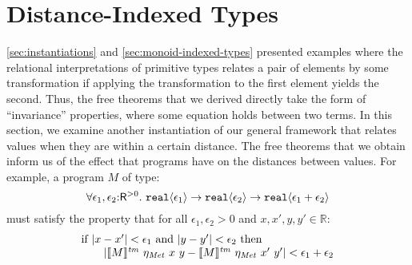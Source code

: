 \section{Distance-Indexed Types}
\label{sec:metric-types}

\newcommand{\Metric}{\mathit{Met}}
\newcommand{\metricSort}{\mathsf{R}^{>0}}

\autoref{sec:instantiations} and \autoref{sec:monoid-indexed-types}
presented examples where the relational interpretations of primitive
types relates a pair of elements by some transformation if applying
the transformation to the first element yields the second. Thus, the
free theorems that we derived directly take the form of ``invariance''
properties, where some equation holds between two terms. In this
section, we examine another instantiation of our general framework
that relates values when they are within a certain distance. The free
theorems that we obtain inform us of the effect that programs have on
the distances between values. For example, a program $M$ of type:
\begin{displaymath}
  \forall \epsilon_1,\epsilon_2\mathord:\metricSort.\ \tyPrim{real}{\epsilon_1} \to \tyPrim{real}{\epsilon_2} \to \tyPrim{real}{\epsilon_1 + \epsilon_2}
\end{displaymath}
must satisfy the property that for all $\epsilon_1, \epsilon_2 > 0$
and $x, x', y, y' \in \mathbb{R}$:
\begin{displaymath}
  \begin{array}{l}
    \textrm{if }|x - x'| < \epsilon_1 \textrm{ and } |y - y'| < \epsilon_2 \textrm{ then}\\
    \hspace{2em}|\tmSem{M}\ \eta_\Metric\ x\ y - \tmSem{M}\ \eta_\Metric\ x'\ y'| < \epsilon_1 + \epsilon_2
  \end{array}
\end{displaymath}

